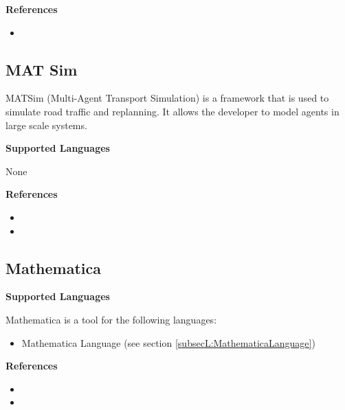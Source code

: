 \textbf{References}
\begin{itemize}
	
\item {}
\end{itemize}



\subsection{MAT Sim}
\label{subsecT:MATSim}


MATSim (Multi-Agent Transport Simulation) is a framework that is used to simulate road traffic and replanning. It allows the developer to model agents in large scale systems.

\textbf{Supported Languages}

None


\textbf{References}
\begin{itemize}
	
\item {}
	
\item {}
\end{itemize}



\subsection{Mathematica}
\label{subsecT:Mathematica}



\textbf{Supported Languages}

Mathematica is a tool for the following languages:
\begin{itemize}
	\item Mathematica Language (see section \ref{subsecL:MathematicaLanguage})
\end{itemize}


\textbf{References}
\begin{itemize}
	
\item {}
	
\item {}
\end{itemize}



